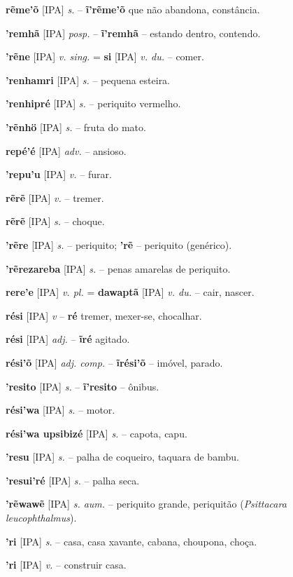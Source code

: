 \textbf{rẽme'õ} [IPA] \textit{s.} -- \textbf{ĩ'rẽme'õ} que não abandona, constância.

\textbf{'remhã} [IPA] \textit{posp.} -- \textbf{ĩ'remhã} -- estando dentro, contendo.

\textbf{'rẽne} [IPA] \textit{v. sing.} = \textbf{si} [IPA] \textit{v. du.} -- comer.

\textbf{'renhamri} [IPA] \textit{s.} -- pequena esteira.

\textbf{'renhipré} [IPA] \textit{s.} -- periquito vermelho.

\textbf{'rẽnhö} [IPA] \textit{s.} -- fruta do mato.

\textbf{repé'é} [IPA] \textit{adv.} -- ansioso.

\textbf{'repu'u} [IPA] \textit{v.} -- furar.

\textbf{rẽrẽ} [IPA] \textit{v.} -- tremer.

\textbf{rẽrẽ} [IPA] \textit{s.} -- choque.

\textbf{'rẽre} [IPA] \textit{s.} -- periquito; \textbf{'rẽ} -- periquito (genérico).

\textbf{'rẽrezareba} [IPA] \textit{s.} -- penas amarelas de periquito.

\textbf{rere'e} [IPA] \textit{v. pl.} = \textbf{dawaptã} [IPA] \textit{v. du.} -- cair, nascer.

\textbf{rési} [IPA] \textit{v} -- \textbf{ré} tremer, mexer-se, chocalhar.

\textbf{rési} [IPA] \textit{adj.} -- \textbf{ĩré} agitado.

\textbf{rési'õ} [IPA] \textit{adj. comp.} -- \textbf{ĩrési'õ} -- imóvel, parado.

\textbf{'resito} [IPA] \textit{s.} -- \textbf{ĩ'resito} -- ônibus.

\textbf{rési'wa} [IPA] \textit{s.} -- motor.

\textbf{rési'wa upsibizé} [IPA] \textit{s.} -- capota, capu.

\textbf{'resu} [IPA] \textit{s.} -- palha de coqueiro, taquara de bambu.

\textbf{'resui'ré} [IPA] \textit{s.} -- palha seca.

\textbf{'rẽwawẽ} [IPA] \textit{s. aum.} -- periquito grande, periquitão (\textit{Psittacara leucophthalmus}).

\textbf{'ri} [IPA] \textit{s.} -- casa, casa xavante, cabana, choupona, choça.

\textbf{'ri} [IPA] \textit{v.} -- construir casa.

